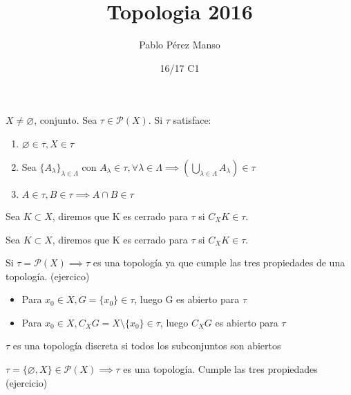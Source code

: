\documentclass[palatino]{apuntes}
\title{Topologia 2016}
\author{Pablo Pérez Manso}
\date{16/17 C1}
\begin{document}
\pagestyle{plain}
\maketitle

\tableofcontents
\newpage

\begin{defn}[Topología]
$X \neq \varnothing$, conjunto. Sea $\tau \in \mathcal{P}(X)$. Si $\tau$ satisface:
\begin{enumerate}
\item $\varnothing \in \tau, X \in \tau$
\item Sea $\{A_\lambda\}_{\lambda \in \Lambda}$ con $ A_\lambda \in \tau, \forall \lambda \in \Lambda \implies  (\bigcup_{\lambda \in \Lambda} A_\lambda) \in \tau$
\item $A \in \tau, B \in \tau \implies A \cap B \in \tau$
\end{enumerate}
\end{defn}



\begin{defn}[Abierto]
Sea $K \subset X$, diremos que K es cerrado para $\tau$ si $C_XK\in\tau$.
\end{defn}
\begin{defn}[Cerrado]
Sea $K \subset X$, diremos que K es cerrado para $\tau$ si $C_XK\in\tau$.
\end{defn}

\begin{example}
	Si $\tau = \mathcal{P}(X) \implies \tau $ es una topología ya que cumple las tres propiedades de una topología. (ejercico)

	\begin{itemize}
		\item Para $x_0 \in X, G=\{x_0\} \in \tau$, luego G es abierto para $\tau$
		\item Para $x_0 \in X, C_XG=X\setminus\{x_0\} \in \tau$, luego $C_XG$ es abierto para $\tau$
	\end{itemize}
\end{example}

\begin{defn}
$\tau$ es una topología discreta si todos los subconjuntos son abiertos
\end{defn}


\begin{example}
$\tau = \{\varnothing, X\} \in \mathcal{P}(X) \implies \tau$ es una topología. Cumple las tres propiedades (ejercicio)
\end{example}
\end{document}
